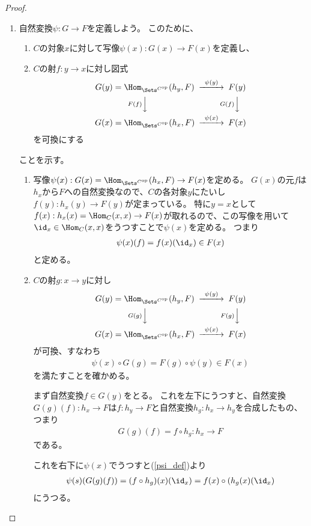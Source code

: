 \documentclass[uplatex]{jsarticle}
\begin{document}
\begin{proof}
\begin{enumerate}
\item 自然変換$\psi:G\to F$を定義しよう。
このために、
\begin{enumerate}
\item $C$の対象$x$に対して写像$\psi(x):G(x) \to F(x)$を定義し、
\item $C$の射$f:y\to x$に対し図式
\[
\begin{CD}
G(y)=\Hom_{\Sets^{C^{\rm op}}}(h_y,F)@>\psi(y)>>F(y)\\
@VF(f)VV@VG(f)VV\\
G(x)=\Hom_{\Sets^{C^{\rm op}}}(h_x,F)@>\psi(x)>>F(x)
\end{CD}
\]
を可換にする
\end{enumerate}
ことを示す。
\begin{enumerate}
\item 写像$\psi(x):G(x)=\Hom_{\Sets^{C^{\rm op}}}(h_x,F)\to F(x)$を定める。
$G(x)$の元$f$は$h_x$から$F$への自然変換なので、$C$の各対象$y$にたいし$f(y):h_x(y)\to F(y)$が定まっている。
特に$y=x$として$f(x):h_x(x)=\Hom_C(x,x)\to F(x)$が取れるので、この写像を用いて
$\id_x\in\Hom_C(x,x)$をうつすことで$\psi(x)$を定める。
つまり
\begin{align}\label{psi_def}
\psi(x)(f)=f(x)(\id_x) \in F(x)
\end{align}
と定める。
\item $C$の射$g:x\to y$に対し
\begin{align}\label{psi_comm}
\begin{CD}
G(y)=\Hom_{\Sets^{C^{\rm op}}}(h_y,F)@>\psi(y)>>F(y)\\
@VG(g)VV@VF(g)VV\\
G(x)=\Hom_{\Sets^{C^{\rm op}}}(h_x,F)@>\psi(x)>>F(x)
\end{CD}
\end{align}
が可換、すなわち
\begin{align*}
\psi(x)\circ G(g)=F(g)\circ\psi(y)\in F(x)
\end{align*}
を満たすことを確かめる。

まず自然変換$f\in G(y)$をとる。
これを左下にうつすと、自然変換$G(g)(f):h_x \to F$は$f:h_y \to F$と自然変換$h_g:h_x \to h_y$を合成したもの、つまり
\begin{align*}
G(g)(f)=f\circ h_g:h_x \to F
\end{align*}
である。

これを右下に$\psi(x)$でうつすと(\ref{psi_def})より
\begin{align}\label{psi_ld}
\psi(s)(G(g)(f))=(f\circ h_g)(x)(\id_x)=f(x)\circ(h_g(x)(\id_x)
\end{align}
にうつる。


\end{enumerate}
\end{enumerate}
\end{proof}
\end{document}

